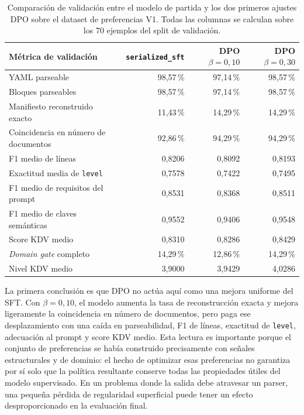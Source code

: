 \begin{table}[htbp]
\centering
\caption{Comparación de validación entre el modelo de partida y los dos primeros ajustes DPO sobre
         el dataset de preferencias V1. Todas las columnas se calculan sobre los 70 ejemplos del
         split de validación.}
\label{tab:ch7_dpo_v1_validation}
\small
\begin{tabularx}{\textwidth}{Xrrr}
\toprule
\textbf{Métrica de validación} &
\textbf{\texttt{serialized\_sft}} &
\textbf{DPO \(\beta=0{,}10\)} &
\textbf{DPO \(\beta=0{,}30\)} \\
\midrule
YAML parseable & 98,57\,\% & 97,14\,\% & 98,57\,\% \\
Bloques parseables & 98,57\,\% & 97,14\,\% & 98,57\,\% \\
Manifiesto reconstruido exacto & 11,43\,\% & 14,29\,\% & 14,29\,\% \\
Coincidencia en número de documentos & 92,86\,\% & 94,29\,\% & 94,29\,\% \\
F1 medio de líneas & 0,8206 & 0,8092 & 0,8193 \\
Exactitud media de \texttt{level} & 0,7578 & 0,7422 & 0,7495 \\
F1 medio de requisitos del prompt & 0,8531 & 0,8368 & 0,8511 \\
F1 medio de claves semánticas & 0,9552 & 0,9406 & 0,9548 \\
Score KDV medio & 0,8310 & 0,8286 & 0,8429 \\
\textit{Domain gate} completo & 14,29\,\% & 12,86\,\% & 14,29\,\% \\
Nivel KDV medio & 3,9000 & 3,9429 & 4,0286 \\
\bottomrule
\end{tabularx}
\end{table}

La primera conclusión es que DPO no actúa aquí como una mejora uniforme del SFT. Con
\(\beta=0{,}10\), el modelo aumenta la tasa de reconstrucción exacta y mejora ligeramente la
coincidencia en número de documentos, pero paga ese desplazamiento con una caída en parseabilidad,
F1 de líneas, exactitud de \texttt{level}, adecuación al prompt y score KDV medio. Esta lectura es
importante porque el conjunto de preferencias se había construido precisamente con señales
estructurales y de dominio: el hecho de optimizar esas preferencias no garantiza por sí solo que la
política resultante conserve todas las propiedades útiles del modelo supervisado. En un problema
donde la salida debe atravesar un parser, una pequeña pérdida de regularidad superficial puede tener
un efecto desproporcionado en la evaluación final.

